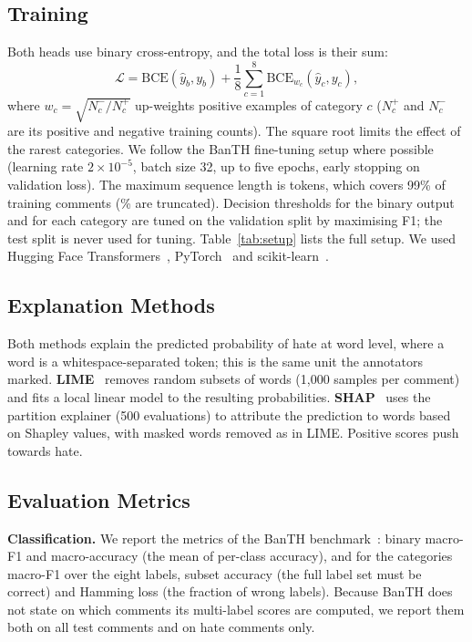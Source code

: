 \documentclass[conference,letterpaper,10pt]{IEEEtran}
\begin{document}
\subsection{Training}
Both heads use binary cross-entropy, and the total loss is their sum:
\begin{equation}
\mathcal{L} = \mathrm{BCE}(\hat{y}_{b}, y_{b}) + \frac{1}{8}\sum_{c=1}^{8} \mathrm{BCE}_{w_c}(\hat{y}_{c}, y_{c}),
\end{equation}
where $w_c = \sqrt{N^{-}_c / N^{+}_c}$ up-weights positive examples of category $c$ ($N^{+}_c$ and $N^{-}_c$ are its positive and negative training counts). The square root limits the effect of the rarest categories. We follow the BanTH fine-tuning setup where possible (learning rate $2\times10^{-5}$, batch size 32, up to five epochs, early stopping on validation loss). The maximum sequence length is \maxLen{} tokens, which covers 99\% of training comments (\truncPct\% are truncated). Decision thresholds for the binary output and for each category are tuned on the validation split by maximising F1; the test split is never used for tuning. Table~\ref{tab:setup} lists the full setup. We used Hugging Face Transformers~\cite{wolf2020transformers}, PyTorch~\cite{paszke2019pytorch} and scikit-learn~\cite{pedregosa2011sklearn}.

\begin{table}[!htb]
\caption{Training Setup}
\label{tab:setup}
\centering
\small

\end{table}

\subsection{Explanation Methods}
Both methods explain the predicted probability of hate at word level, where a word is a whitespace-separated token; this is the same unit the annotators marked.
\textbf{LIME}~\cite{ribeiro2016lime} removes random subsets of words (1,000 samples per comment) and fits a local linear model to the resulting probabilities.
\textbf{SHAP}~\cite{lundberg2017shap} uses the partition explainer (500 evaluations) to attribute the prediction to words based on Shapley values, with masked words removed as in LIME. Positive scores push towards hate.

\subsection{Evaluation Metrics}
\textbf{Classification.} We report the metrics of the BanTH benchmark~\cite{haider2025banth}: binary macro-F1 and macro-accuracy (the mean of per-class accuracy), and for the categories macro-F1 over the eight labels, subset accuracy (the full label set must be correct) and Hamming loss (the fraction of wrong labels). Because BanTH does not state on which comments its multi-label scores are computed, we report them both on all test comments and on hate comments only.
\end{document}
